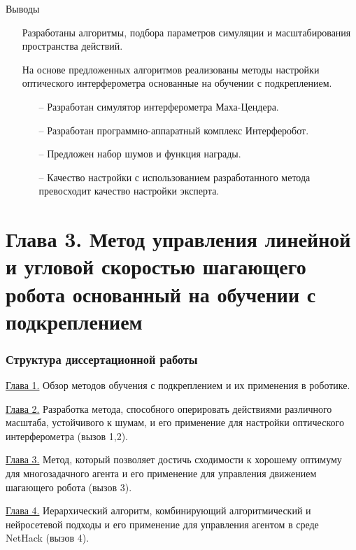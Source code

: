 \begin{frame}{Выводы}
\begin{itemize}
    \item[\textcolor{ForestGreen}{\checkmark}] Разработаны алгоритмы, подбора параметров симуляции и масштабирования пространства действий. 
    \item[\textcolor{ForestGreen}{\checkmark}] На основе предложенных алгоритмов реализованы методы настройки оптического интерферометра основанные на обучении с подкреплением.
    \begin{itemize}
        \item[--] Разработан симулятор интерферометра Маха-Цендера.
        \item[--] Разработан программно-аппаратный комплекс Интерферобот.
        \item[--] Предложен набор шумов и функция награды.
        \item[--] Качество настройки с использованием разработанного метода превосходит качество настройки эксперта.
    \end{itemize}
    
    
\end{itemize}
    



\end{frame}



\section{Глава 3. Метод управления линейной и угловой скоростью шагающего робота основанный на обучении с подкреплением}

\begin{frame}
    \frametitle{Структура диссертационной работы}
    \begin{itemize}
        \item \underline{Глава 1.} Обзор методов обучения с подкреплением и их применения в роботике. 
        \item \underline{Глава 2.} Разработка метода, способного оперировать действиями различного масштаба, устойчивого к шумам, и его применение для настройки оптического интерферометра (вызов 1,2).
        {\color{orange}\item \underline{Глава 3.} Метод, который позволяет достичь сходимости к хорошему оптимуму для многозадачного агента и его применение  для управления движением шагающего робота (вызов 3).}
        \item \underline{Глава 4.} Иерархический алгоритм, комбинирующий алгоритмический и нейросетевой подходы и его применение для управления агентом в среде NetHack (вызов 4).
    \end{itemize}
\end{frame}

